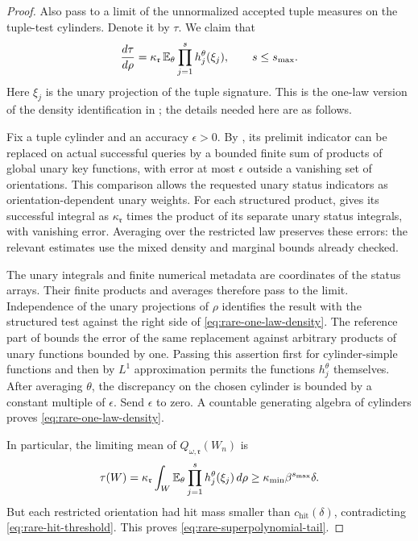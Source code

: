 \begin{proof}
Also pass to a limit of the unnormalized accepted tuple measures on
the tuple-test cylinders.  Denote it by \(\tau\).
We claim that
\begin{equation}
 \frac{d\tau}{d\rho}
   =\kappa_{\mathfrak r}\,
      \mathbb E_\theta\prod_{j=1}^{s}h_j^\theta(\xi_j),
 \qquad s\le s_{\max}.
 \label{eq:rare-one-law-density}
\end{equation}
Here \(\xi_j\) is the unary projection of the tuple signature.
This is the one-law version of the density identification in
; the details needed here are as follows.

Fix a tuple cylinder and an accuracy \(\epsilon>0\).
By , its prelimit indicator can be replaced
on actual successful queries by a bounded finite sum of products
of global unary key functions, with error at most \(\epsilon\)
outside a vanishing set of orientations.
This comparison allows the requested unary status indicators as
orientation-dependent unary weights.
For each structured product,  gives its
successful integral as \(\kappa_{\mathfrak r}\) times the product
of its separate unary status integrals, with vanishing error.
Averaging over the restricted law preserves these errors:
the relevant estimates use the mixed density and marginal bounds
already checked.

The unary integrals and finite numerical metadata are coordinates of
the status arrays.  Their finite products and averages therefore pass
to the limit.  Independence of the unary projections of \(\rho\)
identifies the result with the structured test against the right side
of \eqref{eq:rare-one-law-density}.
The reference part of  bounds the error of the
same replacement against arbitrary products of unary functions
bounded by one.  Passing this assertion first for cylinder-simple
functions and then by \(L^1\) approximation permits the functions
\(h_j^\theta\) themselves.
After averaging \(\theta\), the discrepancy on the chosen cylinder
is bounded by a constant multiple of \(\epsilon\).
Send \(\epsilon\) to zero.  A countable generating algebra of
cylinders proves \eqref{eq:rare-one-law-density}.

In particular, the limiting mean of
\(Q_{\omega,\mathfrak r}(W_n)\) is
\[
 \tau(W)
 =\kappa_{\mathfrak r}
   \int_W \mathbb E_\theta\prod_{j=1}^{s}h_j^\theta(\xi_j)\,d\rho
 \ge\kappa_{\min}\beta^{s_{\max}}\delta.
\]
But each restricted orientation had hit mass smaller than
\(c_{\mathrm{hit}}(\delta)\), contradicting
\eqref{eq:rare-hit-threshold}.
This proves \eqref{eq:rare-superpolynomial-tail}.
\end{proof}

